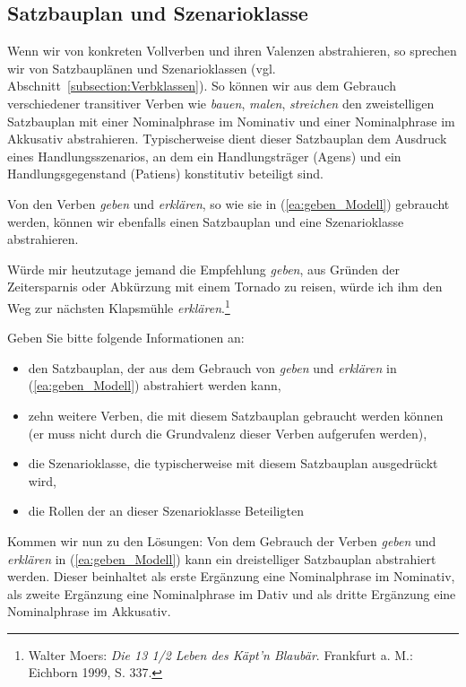 \subsection{Satzbauplan und Szenarioklasse}\label{subsection:Valenz2}

Wenn wir von konkreten Vollverben und ihren Valenzen abstrahieren, so sprechen wir von Satzbauplänen und Szenarioklassen (vgl. Abschnitt~\ref{subsection:Verbklassen}). So können wir aus dem Gebrauch verschiedener transitiver Verben wie \textit{bauen}, \textit{malen}, \textit{streichen} den zweistelligen Satzbauplan mit einer Nominalphrase im Nominativ und einer Nominalphrase im Akkusativ abstrahieren. Typischerweise dient dieser Satzbauplan dem Ausdruck eines Handlungsszenarios, an dem ein Handlungsträger (Agens) und ein Handlungsgegenstand (Patiens) konstitutiv beteiligt sind.

Von den Verben \textit{geben} und \textit{erklären}, so wie sie in (\ref{ea:geben_Modell}) gebraucht werden, können wir ebenfalls einen Satzbauplan und eine Szenarioklasse abstrahieren.   

\ea \label{ea:geben_Modell} Würde mir heutzutage jemand die Empfehlung \textit{geben}, aus Gründen der Zeitersparnis oder Abkürzung mit einem Tornado zu reisen, würde ich ihm den Weg zur nächsten Klapsmühle \textit{erklären}.\footnote{Walter Moers: \textit{Die 13 1/2 Leben des Käpt'n Blaubär}. Frankfurt a. M.: Eichborn 1999, S. 337.}
\z 

Geben Sie bitte folgende Informationen an:

\begin{itemize}

\item den Satzbauplan, der aus dem Gebrauch von \textit{geben} und \textit{erklären} in (\ref{ea:geben_Modell}) abstrahiert werden kann,

\item zehn weitere Verben, die mit diesem Satzbauplan gebraucht werden können (er muss nicht durch die Grundvalenz dieser Verben aufgerufen werden),

\item die Szenarioklasse, die typischerweise mit diesem Satzbauplan ausgedrückt wird,

\item die Rollen der an dieser Szenarioklasse Beteiligten

\end{itemize}


Kommen wir nun zu den Lösungen: Von dem Gebrauch der Verben \textit{geben} und \textit{erklären} in (\ref{ea:geben_Modell}) kann ein dreistelliger Satzbauplan abstrahiert werden. Dieser beinhaltet als erste Ergänzung eine Nominalphrase im Nominativ, als zweite Ergänzung eine Nominalphrase im Dativ und als dritte Ergänzung eine Nominalphrase im Akkusativ. 

